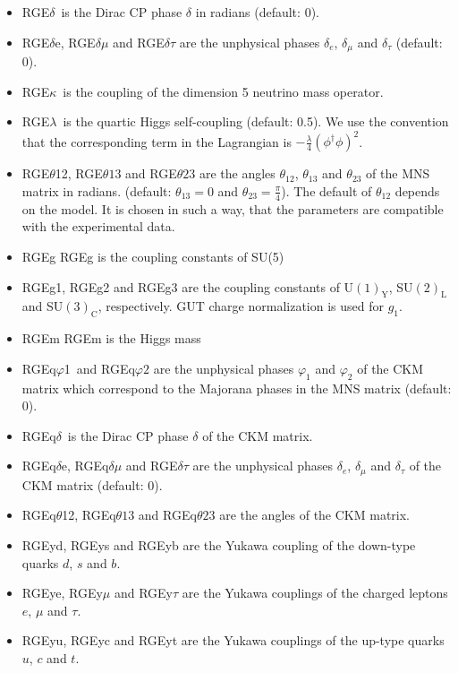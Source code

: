 \documentclass[10pt,a4paper,twoside]{scrartcl}
\begin{document}
\begin{itemize}
\item RGE$\delta$\ is the Dirac CP phase $\delta$ in radians (default: $0$).
\item RGE$\delta$e, RGE$\delta\mu$ and RGE$\delta\tau$ are the unphysical phases $\delta_e$,
  $\delta_\mu$ and $\delta_\tau$ (default: $0$). 
\item RGE$\kappa$\ is the coupling of the dimension 5 neutrino mass operator.
  
\item RGE$\lambda$\ is the quartic Higgs self-coupling (default: 0.5).  We use the
  convention that the corresponding term in the Lagrangian is
  $-\frac{\lambda}{4} (\phi^\dagger \phi)^2$.
  
\item RGE$\theta$12, RGE$\theta13$ and RGE$\theta23$ are the angles $\theta_{12}$, $\theta_{13}$
and $\theta_{23}$ of the MNS matrix in radians. (default: $\theta_{13}=0$ and
$\theta_{23}=\frac{\pi}{4}$). The default of $\theta_{12}$ depends on the
model. It is chosen in such a way, that the parameters are compatible with the
experimental data. 
\item RGEg RGEg is the coupling constants of SU(5)
  
\item RGEg1, RGEg2 and RGEg3 are the coupling constants of U$(1)_\mathrm{Y}$,
  SU$(2)_\mathrm{L}$ and SU$(3)_\mathrm{C}$, respectively.  GUT charge
  normalization is used for $g_1$.
  
\item RGEm RGEm is the Higgs mass
  
\item RGEq$\varphi$1\ and RGEq$\varphi2$ are the unphysical phases $\varphi_1$ and $\varphi_2$ of the
 CKM matrix which correspond to the Majorana phases in the MNS matrix (default: $0$).
\item RGEq$\delta$\ is the Dirac CP phase $\delta$ of the CKM matrix.
\item RGEq$\delta$e, RGEq$\delta\mu$ and RGE$\delta\tau$ are the unphysical phases $\delta_e$,
$\delta_\mu$ and $\delta_\tau$ of the CKM matrix (default: $0$).
\item RGEq$\theta$12, RGEq$\theta13$ and RGEq$\theta23$ are the angles of the CKM matrix. 
\item RGEyd, RGEys and RGEyb are the Yukawa coupling of the down-type quarks $d$,
  $s$ and $b$.
\item RGEye, RGEy$\mu$ and RGEy$\tau$ are the Yukawa couplings of the charged
  leptons $e$, $\mu$ and $\tau$.
\item RGEyu, RGEyc and RGEyt are the Yukawa couplings of the up-type quarks $u$,
  $c$ and $t$.

\end{itemize}
\end{document}
